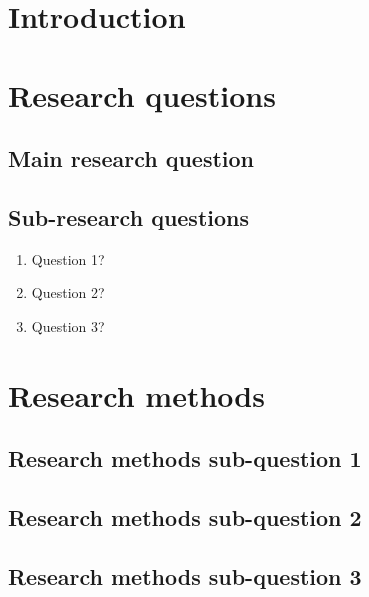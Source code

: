 \documentclass[man,floatsintext]{apa7}
\title{}
\author{Firstname Lastname (Studentnr)}
\date{\today}
\begin{document}
\maketitle

\newpage

\tableofcontents

\newpage 

\begin{versionhistory}
\end{versionhistory}

\newpage
\section{Introduction}

\section{Research questions}
\subsection{Main research question}

\subsection{Sub-research questions}
\begin{enumerate}{}{}
	\item Question 1?
	\item Question 2?
	\item Question 3?
\end{enumerate}

\newpage

\section{Research methods}
\subsection{Research methods sub-question 1}

\subsection{Research methods sub-question 2}

\subsection{Research methods sub-question 3}
\end{document}

